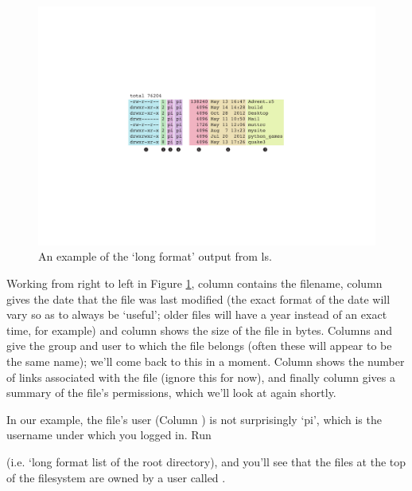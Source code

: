 \begin{figure}
\centerline{\includegraphics[width=14cm]{images/longformls}}
\caption{An example of the `long format' output from ls.}\label{figure:longformls}
\end{figure}

Working from right to left in Figure \ref{figure:longformls}, column \protect{} contains the filename, column \protect{} gives the date that the file was last modified (the exact format of the date will vary so as to always be `useful'; older files will have a year instead of an exact time, for example) and column \protect{} shows the size of the file in bytes. Columns \protect{} and \protect{} give the group and user to which the file belongs (often these will appear to be the same name); we'll come back to this in a moment. Column \protect{} shows the number of links associated with the file (ignore this for now), and finally column \protect{} gives a summary of the file's permissions, which we'll look at again shortly. 

In our example, the file's user (Column \protect{}) is not surprisingly `pi', which is the username under which you logged in. Run 


(i.e. `long format list of the root directory), and you'll see that the files at the top of the filesystem are owned by a user called . 

